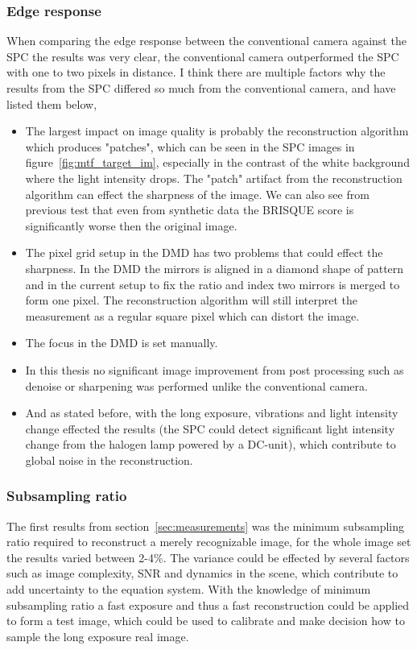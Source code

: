 \subsubsection{Edge response}
When comparing the edge response between the conventional camera against the SPC the results was very clear, the conventional camera outperformed the SPC with one to two pixels in distance. I think there are multiple factors why the results from the SPC differed so much from the conventional camera, and have listed them below,

\begin{itemize}
\item The largest impact on image quality is probably the reconstruction algorithm which produces "patches", which can be seen in the SPC images in figure~\ref{fig:mtf_target_im}, especially in the contrast of the white background where the light intensity drops. The "patch" artifact from the reconstruction algorithm can effect the sharpness of the image. We can also see from previous test that even from synthetic data the BRISQUE score is significantly worse then the original image.

\item The pixel grid setup in the DMD has two problems that could effect the sharpness. In the DMD the mirrors is aligned in a diamond shape of pattern and in the current setup to fix the ratio and index two mirrors is merged to form one pixel. The reconstruction algorithm will still interpret the measurement as a regular square pixel which can distort the image.

\item The focus in the DMD is set manually.

\item In this thesis no significant image improvement from post processing such as denoise or sharpening was performed unlike the conventional camera.

\item And as stated before, with the long exposure, vibrations and light intensity change effected the results (the SPC could detect significant light intensity change from the halogen lamp powered by a DC-unit), which contribute to global noise in the reconstruction.

\end{itemize}



\subsubsection{Subsampling ratio}
The first results from section~\ref{sec:measurements} was the minimum subsampling ratio required to reconstruct a merely recognizable image, for the whole image set the results varied between 2-4\%. The variance could be effected by several factors such as image complexity, SNR and dynamics in the scene, which contribute to add uncertainty to the equation system. With the knowledge of minimum subsampling ratio a fast exposure and thus a fast reconstruction could be applied to form a test image, which could be used to calibrate and make decision how to sample the long exposure real image.\\[0.1in]


